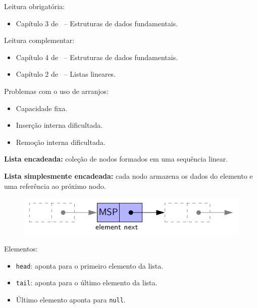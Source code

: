 \newcommand{\defs}{../defs}


\newcommand{\content}{Estruturas de dados fundamentais}
\newcommand{\class}{Algoritmos e Estruturas de Dados}
\newcommand{\shortcourse}{45EST}



\makeheader

{
Leitura obrigatória:
\begin{itemize}
	\item Capítulo 3 de~\cite{GoodrichEtAl2014} -- Estruturas de dados fundamentais.
\end{itemize}

Leitura complementar:
\begin{itemize}
	\item Capítulo 4 de~\cite{Preiss2001} -- Estruturas de dados fundamentais.
	\item Capítulo 2 de~\cite{Pereira2008} -- Listas lineares.
\end{itemize}
}

\medskip


Problemas com o uso de arranjos:
\begin{itemize}
	\item Capacidade fixa.
	\item Inserção interna dificultada.
	\item Remoção interna dificultada.
\end{itemize}

\medskip

\textbf{Lista encadeada:} coleção de nodos formados em uma sequência linear.

\textbf{Lista simplesmente encadeada:} cada nodo armazena os dados do elemento e uma referência ao próximo nodo.

\begin{figure}[H]
	\centering
	\includegraphics[width=0.7\linewidth]{img/figure-3-10}
\end{figure}

Elementos:
\begin{itemize}
	\item \texttt{head}: aponta para o primeiro elemento da lista.
	\item \texttt{tail}: aponta para o último elemento da lista.
	\item Último elemento aponta para \texttt{null}.
\end{itemize}

